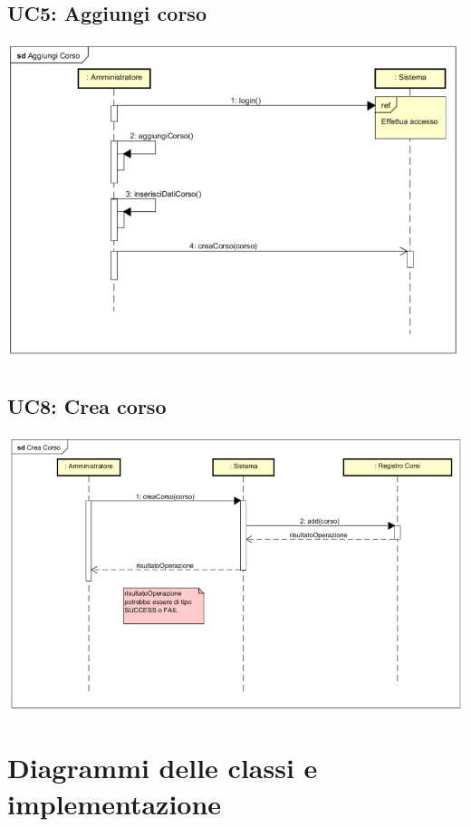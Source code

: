 \documentclass[12pt]{report}
\begin{document}
	\subsection{UC5: Aggiungi corso}
	\begin{center}
		\includegraphics{./images/AggiungiCorso.png}
	\end{center}
		
	\subsection{UC8: Crea corso}
	\begin{center}
		\includegraphics[scale=0.8]{./images/CreaCorso.png}
	\end{center}


	\newpage
	
	\section{Diagrammi delle classi e implementazione}
	
\end{document}
